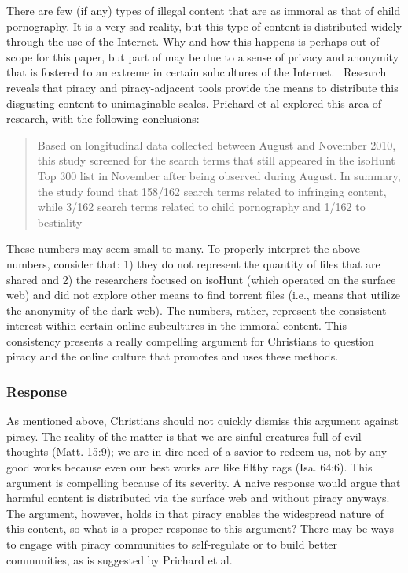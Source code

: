 \documentclass[onecolumn, 12pt]{article}
\begin{document}
\begin{refsection}
There are few (if any) types of illegal content that are as immoral as that of
child pornography. It is a very sad reality, but this type of content is
distributed widely through the use of the Internet. Why and how this happens is
perhaps out of scope for this paper, but part of may be due to a sense of
privacy and anonymity that is fostered to an extreme in certain subcultures of
the Internet.~\cite[588]{prichard:subcultures} Research reveals that piracy and
piracy-adjacent tools provide the means to distribute this disgusting content
to unimaginable scales. Prichard et al explored this area of research, with
the following conclusions:
\blockcquote[593]{prichard:subcultures}{%
  Based on longitudinal data collected between August and November 2010, this
  study screened for the search terms that still appeared in the isoHunt Top
  300 list in November after being observed during August. In summary, the
  study found that 158/162 search terms related to infringing content, while
  3/162 search terms related to child pornography and 1/162 to bestiality%
}
These numbers may seem small to many. To properly interpret the above numbers,
consider that: 1) they do not represent the quantity of files that are shared
and 2) the researchers focused on isoHunt (which operated on the surface web)
and did not explore other means to find torrent files (i.e., means that utilize
the anonymity of the dark web). The numbers, rather, represent the consistent
interest within certain online subcultures in the immoral content. This
consistency presents a really compelling argument for Christians to question
piracy and the online culture that promotes and uses these methods.

\subsubsection{Response}
As mentioned above, Christians should not quickly dismiss this argument against
piracy. The reality of the matter is that we are sinful creatures full of
evil thoughts (Matt. 15:9); we are in dire need of a savior to redeem us, not
by any good works because even our best works are like filthy rags (Isa. 64:6).
This argument is compelling because of its severity. A naive response would
argue that harmful content is distributed via the surface web and without
piracy anyways. The argument, however, holds in that piracy enables the
widespread nature of this content, so what is a proper response to this
argument? There may be ways to engage with piracy communities to self-regulate
or to build better communities, as is suggested by Prichard et
al.~\cite[595--596]{prichard:subcultures}


\end{refsection}
\end{document}
